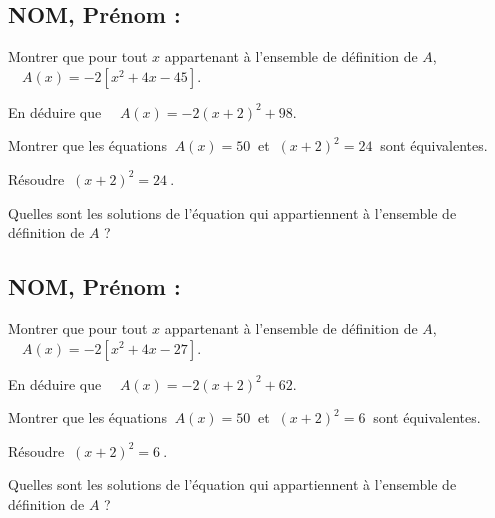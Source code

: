 \documentclass[a4paper,11pt,exos]{nsi}
\begin{document}
\subsection*{NOM, Prénom : \dotfill} 


\maketitle

\begin{enumalph}
    \item Montrer que pour tout $x$ appartenant à l'ensemble de définition de $A$, $\quad A(x)=-2\left[x^2+4x-45\right]$.
    \item En déduire que $\quad A(x)=-2(x+2)^2+98$.
    \item Montrer que les équations $\ A(x)=50\ $ et $\ (x+2)^2=24\ $ sont équivalentes. 
    \item Résoudre $\ (x+2)^2=24\ $. 
    \item Quelles sont les solutions de l'équation qui appartiennent à l'ensemble de définition de $A$ ?
\end{enumalph}


\subsection*{NOM, Prénom : \dotfill} 


\maketitle

\begin{enumalph}
    \item Montrer que pour tout $x$ appartenant à l'ensemble de définition de $A$, $\quad A(x)=-2\left[x^2+4x-27\right]$.
    \item En déduire que $\quad A(x)=-2(x+2)^2+62$.
    \item Montrer que les équations $\ A(x)=50\ $ et $\ (x+2)^2=6\ $ sont équivalentes. 
    \item Résoudre $\ (x+2)^2=6\ $. 
    \item Quelles sont les solutions de l'équation qui appartiennent à l'ensemble de définition de $A$ ?
\end{enumalph}
\end{document}
